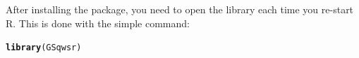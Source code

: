 \documentclass[a4paper,11pt]{article}\usepackage[]{graphicx}\usepackage[]{color}
\makeatletter
\newcommand{\hlkwd}[1]{\textcolor[rgb]{0.737,0.353,0.396}{\textbf{#1}}}%
\newenvironment{kframe}{%
 \def\at@end@of@kframe{}%
 \ifinner\ifhmode%
  \def\at@end@of@kframe{\end{minipage}}%
  \begin{minipage}{\columnwidth}%
 \fi\fi%
 \def\FrameCommand##1{\hskip\@totalleftmargin \hskip-\fboxsep
 \colorbox{shadecolor}{##1}\hskip-\fboxsep
     \hskip-\linewidth \hskip-\@totalleftmargin \hskip\columnwidth}%
 \MakeFramed {\advance\hsize-\width
   \@totalleftmargin\z@ \linewidth\hsize
   \@setminipage}}%
 {\par\unskip\endMakeFramed%
 \at@end@of@kframe}
\newenvironment{knitrout}{}{} %
\makeatother
\begin{document}
After installing the package, you need to open the library each time you re-start R.  This is done with the simple command:
\begin{knitrout}
\color{fgcolor}\begin{kframe}
\begin{alltt}
\hlkwd{library}(GSqwsr)
\end{alltt}
\end{kframe}
\end{knitrout}
\end{document}
